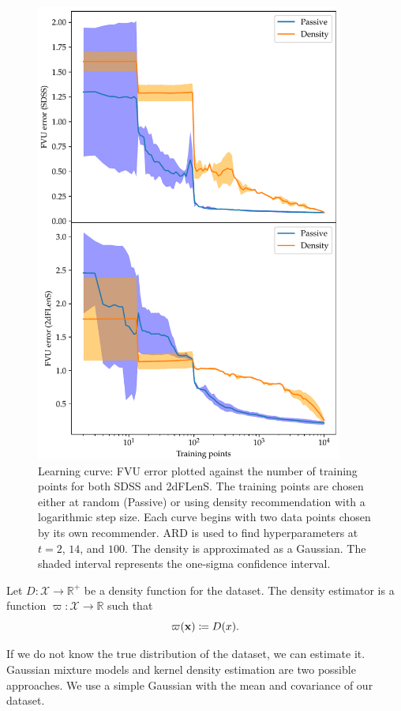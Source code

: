 \documentclass[11pt,twoside,openright]{report}
\newcommand\bbR{\mathbb{R}}
\newcommand\bx{\mathbf{x}}
\newcommand\cX{\mathcal{X}}
\begin{document}
  \begin{figure}
    \centering
    \includegraphics[width=0.9\textwidth]{density_fvu1.pdf}
    \caption{Learning curve: FVU error plotted against the number of training points for both SDSS and 2dFLenS. The training points are chosen either at random (Passive) or using density recommendation with a logarithmic step size. Each curve begins with two data points chosen by its own recommender. ARD is used to find hyperparameters at $t=2$, $14$, and $100$. The density is approximated as a Gaussian. The shaded interval represents the one-sigma confidence interval.}
    \label{fig:density_fvu1}
  \end{figure}{}

  Let $D : \cX \to \bbR^+$ be a density function for the dataset. The density estimator is a function $\varpi : \cX \to \bbR$ such that \[
    \varpi(\bx) \coloneqq D(x) \text.
  \]

  If we do not know the true distribution of the dataset, we can estimate it. Gaussian mixture models and kernel density estimation are two possible approaches. We use a simple Gaussian with the mean and covariance of our dataset.
\end{document}

